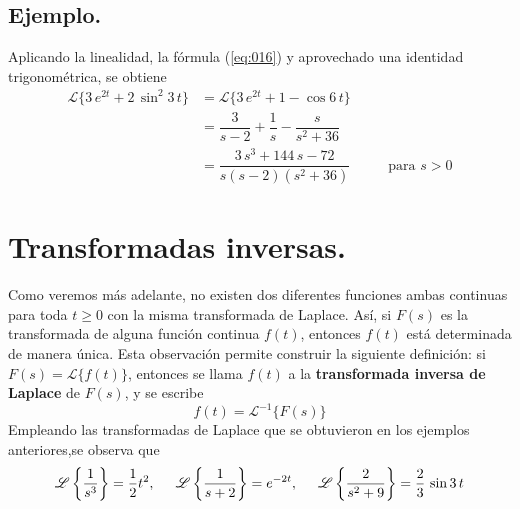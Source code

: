 \subsection*{Ejemplo.}
Aplicando la linealidad, la fórmula (\ref{eq:016}) y aprovechado una identidad trigonométrica, se obtiene
\begin{align*}
\mathscr{L} \{ 3 \, e^{2t} + 2 \, \sin^{2} 3 \, t \} &= \mathscr{L} \{ 3 \, e^{2t} + 1 - \cos 6 \, t \} \\[0.5em]
&= \dfrac{3}{s - 2} + \dfrac{1}{s} - \dfrac{s}{s^{2} + 36} \\[0.5em]
&= \dfrac{3 \, s^{3} + 144 \, s - 72}{s(s - 2)(s^{2} +  36)} \hspace{1cm} \mbox{ para } s > 0
\end{align*}
\section{Transformadas inversas.}
Como veremos más adelante, no existen dos diferentes funciones ambas continuas para toda $t \geq 0$ con la misma transformada de Laplace. Así, si $F(s)$ es la transformada de alguna función continua $f(t)$, entonces $f(t)$ está determinada de manera única. Esta observación permite construir la siguiente definición: si $F(s) = \mathscr{L}
 \{ f(t) \}$, entonces se llama $f(t)$ a la \textbf{transformada inversa de Laplace} de $F(s)$, y se escribe
\begin{equation}
f(t) = \mathscr{L}^{-1} \{ F(s) \}
\label{eq:018}
\end{equation}
Empleando las transformadas de Laplace que se obtuvieron en los ejemplos anteriores,se observa que
\begin{align*}
\mathscr{L} \left\lbrace \dfrac{1}{s^{3}} \right\rbrace = \dfrac{1}{2} t^{2}, \hspace{0.5cm} \mathscr{L} \left\lbrace \dfrac{1}{s + 2} \right\rbrace = e^{-2t}, \hspace{0.5cm} \mathscr{L} \left\lbrace \dfrac{2}{s^{2} + 9} \right\rbrace = \dfrac{2}{3} \, \sin 3 \, t
\end{align*}

